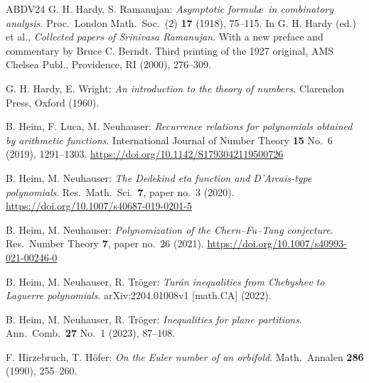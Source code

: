 \documentclass[11pt,reqno]{amsart}
\theoremstyle{plain}
\theoremstyle{remark}
\theoremstyle{definition}
\numberwithin{equation}{section}
\begin{document}
\begin{thebibliography}{ABDV24}
G. H.  Hardy,
S. Ramanujan: \emph{Asymptotic formul\ae\ in combinatory analysis.\/} Proc.\ London Math.\ Soc.\ (2)
\textbf{17} (1918), 75--115.
In G. H. Hardy
(ed.) et al.,
\emph{Collected papers of Srinivasa Ramanujan\/}. With a new preface and commentary by Bruce C. Berndt. Third printing of the 1927 original, AMS Chelsea Publ., Providence, RI
(2000), 276--309.

 G. H. Hardy, E. Wright: \emph{An introduction to the theory of numbers.\/}
Clarendon Press, Oxford (1960).

 B. Heim, F. Luca, M. Neuhauser:
\emph{Recurrence relations for polynomials obtained
by arithmetic functions\/}.
International Journal of Number Theory
\textbf{15}
No.\ 6 (2019), 1291--1303.
\url{https://doi.org/10.1142/S1793042119500726}

B. Heim, M. Neuhauser: \emph{The Dedekind eta function and D'Arcais-type polynomials\/}.
Res.\ Math.\ Sci.\ \textbf{7},
paper no.\ 3 (2020).
\url{https://doi.org/10.1007/s40687-019-0201-5}

 B. Heim, M. Neuhauser: \emph{Polynomization of the Chern--Fu--Tang conjecture\/}. Res.\ Number Theory \textbf{7},
paper no.\ 26 (2021).
\url{https://doi.org/10.1007/s40993-021-00246-0}


 B. Heim, M. Neuhauser, R. Tr\"{o}ger: 
\emph{Tur\'{a}n inequalities from Chebyshev to Laguerre polynomials\/}.
%
arXiv:2204.01008v1 [math.CA] (2022).


  B. Heim, M. Neuhauser, R. Tr\"{o}ger:
\emph{Inequalities for plane partitions\/}.
Ann.\ Comb.\ \textbf{27} No.\ 1 (2023), 87--108.


 F. Hirzebruch,
T. H\"ofer:
\emph{On the Euler number of an orbifold\/}.
Math.\ Annalen \textbf{286} (1990), 255--260.










\end{thebibliography}
\end{document}
